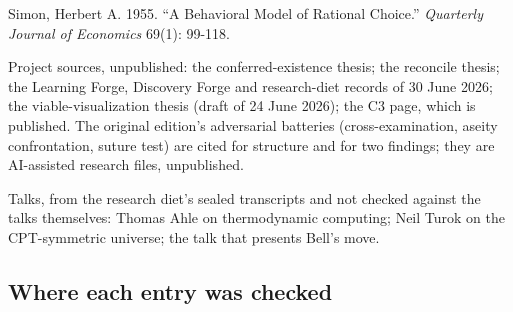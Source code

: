 \documentclass[11pt]{article}
\begin{document}
Simon, Herbert A. 1955. ``A Behavioral Model of Rational Choice.'' \emph{Quarterly Journal of Economics} 69(1): 99-118.

Project sources, unpublished: the conferred-existence thesis; the reconcile thesis; the Learning Forge, Discovery Forge and research-diet records of 30 June 2026; the viable-visualization thesis (draft of 24 June 2026); the C3 page, which is published. The original edition's adversarial batteries (cross-examination, aseity confrontation, suture test) are cited for structure and for two findings; they are AI-assisted research files, unpublished.

Talks, from the research diet's sealed transcripts and not checked against the talks themselves: Thomas Ahle on thermodynamic computing; Neil Turok on the CPT-symmetric universe; the talk that presents Bell's move.

\subsection*{Where each entry was checked}
\end{document}
